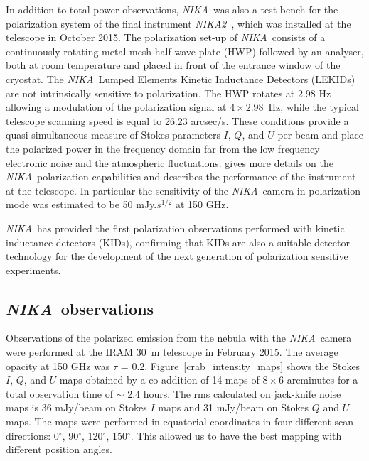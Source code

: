 \documentclass[twocolumn,traditabstract]{aa}
\def\NIKA{\textit{NIKA}}
\def\NIKAd{\textit{NIKA2}}
\begin{document}
In addition to total power observations, \NIKA\ was also a test
bench for the polarization system of the final instrument
\NIKAd\ \citep{calvo2016,catalano2016nika2,2017arXiv170700908A}, which was installed at the
telescope in October 2015. The polarization set-up of \NIKA\
consists of a continuously rotating metal mesh half-wave plate (HWP)
followed by an analyser, both at room temperature and placed in
front of the entrance window of the cryostat. The \NIKA\ Lumped Elements Kinetic
Inductance Detectors (LEKIDs) are not intrinsically sensitive to
polarization. The HWP rotates at 2.98 Hz allowing a modulation of the polarization signal at $4\times 2.98$~Hz, while the typical telescope scanning speed is equal to 26.23 arcsec/s.
These conditions provide a quasi-simultaneous measure of Stokes parameters $I$, $Q$, and $U$
per beam and place the polarized power in the frequency domain far from the low frequency
electronic noise and the atmospheric fluctuations. \cite{ritacco2017} gives more
details on the \NIKA\ polarization capabilities and describes the performance of
the instrument at the telescope. In particular the sensitivity of the
\NIKA\ camera in polarization mode was estimated to be 50 mJy.$s^{1/2}$ at 150
GHz.

\NIKA\ has provided the first polarization
observations performed with kinetic inductance detectors (KIDs), confirming that KIDs are also a
suitable detector technology for the development  of the next generation of polarization sensitive
experiments.

\subsection{\NIKA\ observations}\label{sec:nika_observations}
Observations of the polarized emission from the  nebula with the \NIKA\ camera were performed at
the IRAM 30~m telescope in February 2015. The average opacity at 150 GHz was $\tau$ = 0.2.  Figure~\ref{crab_intensity_maps} shows
the Stokes $I$, $Q$, and $U$ maps obtained by a co-addition of 14 maps
of $8 \times 6$ arcminutes for a total observation time of $\sim$ 2.4 hours. The rms calculated on jack-knife noise maps is 36 mJy/beam on Stokes $I$ maps and 31 mJy/beam on  Stokes $Q$ and $U$ maps.
The maps were performed in equatorial coordinates in four different scan
directions: 0$^{\circ}$, 90$^{\circ}$, 120$^{\circ}$, 150$^{\circ}$. This allowed us to have the best mapping with different position angles.
\end{document}
